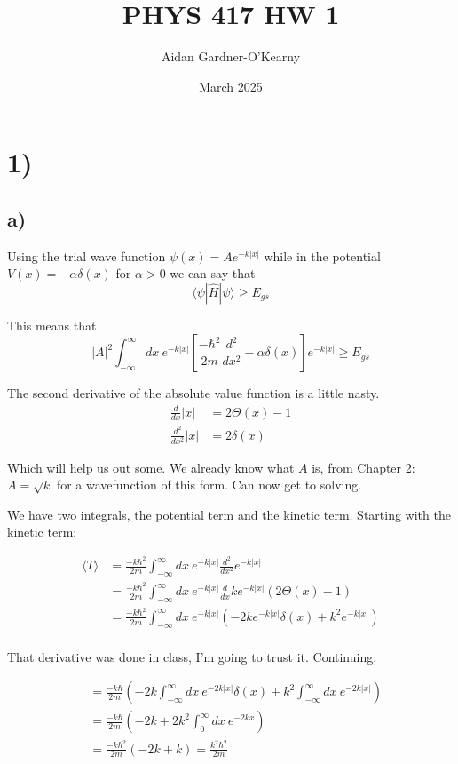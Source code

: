 \documentclass{article}
\title{PHYS 417 HW 1}
\author{Aidan Gardner-O'Kearny}
\date{March 2025}
\newcommand{\p}[1]{\left(#1\right)}
\newcommand{\braket}[1]{\langle#1\rangle}
\begin{document}
\maketitle

\section*{1)}
\subsection*{a)}

Using the trial wave function $\psi(x)=Ae^{-k|x|}$ while in the potential $V(x)=-\alpha\delta\p{x}$ for $\alpha>0$ we can say that $$\langle\psi|\hat{H}|\psi\rangle\geq{E_{gs}}$$

This means that \[
    |A|^2\int_{-\infty}^{\infty}dx\:e^{-k|x|}[\frac{-\hbar^2}{2m}\frac{d^2}{dx^2}-\alpha\delta(x)]e^{-k|x|}\geq{E_{gs}}
\]

The second derivative of the absolute value function is a little nasty.
\begin{align*}
    \frac{d}{dx}|x|&=2\Theta\p{x}-1\\[1em]
    \frac{d^2}{dx^2}|x|&=2\delta\p{x}
\end{align*}

Which will help us out some. We already know what $A$ is, from Chapter 2: $A=\sqrt{k}$ for a wavefunction of this form. Can now get to solving.

We have two integrals, the potential term and the kinetic term. Starting with the kinetic term:

\begin{align}
    \braket{T}&=\frac{-k\hbar^2}{2m}\int_{-\infty}^{\infty}dx\:e^{-k|x|}\frac{d^2}{dx^2}e^{-k|x|}\\[1em]
    &=\frac{-k\hbar^2}{2m}\int_{-\infty}^{\infty}dx\:e^{-k|x|}\frac{d}{dx}ke^{-k|x|}\p{2\Theta(x)-1}\\[1em]
    &=\frac{-k\hbar^2}{2m}\int_{-\infty}^{\infty}dx\:e^{-k|x|}\p{-2ke^{-k|x|}\delta{(x)}+k^2e^{-k|x|}}\\[1em]
\end{align}

That derivative was done in class, I'm going to trust it. Continuing;

\begin{align*}
    &=\frac{-k\hbar}{2m}\p{-2k\int_{-\infty}^{\infty}dx\:e^{-2k|x|}\delta(x)+k^2\int_{-\infty}^{\infty}dx\:e^{-2k|x|}}\\[1em]
    &=\frac{-k\hbar}{2m}\p{-2k+2k^2\int_{0}^{\infty}dx\:e^{-2kx}}\\[1em]
    &=\frac{-k\hbar^2}{2m}\p{-2k+k}=\frac{k^2\hbar^2}{2m}
\end{align*}
\end{document}
